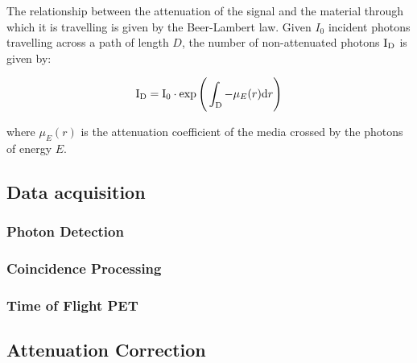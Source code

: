                 The relationship between the attenuation of the signal and the material through which it is travelling is given by the Beer-Lambert law. Given $I_0$ incident photons travelling across a path of length $D$, the number of non-attenuated photons $\mathrm{I}_{\mathrm{D}}$ is given by:
                 
                \begin{equation} \label{eq:beer_lambert_law}
                    \mathrm{I}_{\mathrm{D}}=\mathrm{I}_{0} \cdot \exp \Bigg(\int_{\mathrm{D}}-\mu_E(r)\mathrm{d} r\Bigg)
                \end{equation}

                \noindent where $\mu_E(r)$ is the attenuation coefficient of the media crossed by the photons of energy $E$.
        
        \subsection{Data acquisition} \label{data_acquisition}
            \blindtext
            
            \subsubsection{Photon Detection} \label{photon_detection}
                \blindtext
            
            \subsubsection{Coincidence Processing} \label{coincidence_processing}
                \blindtext
            
            \subsubsection{Time of Flight PET} \label{tof_pet}
                \blindtext
            
        \subsection{Attenuation Correction} \label{attenuation_correction}
            \blindtext
            
